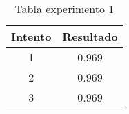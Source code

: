 \begin{table}[!ht]
\begin{center}
\begin{tabular}{|c|c|}\hline
{\bf Intento} & {\bf Resultado}\\ \hline
1 & 0.969\\
2 & 0.969\\
3 & 0.969\\
\hline
\end{tabular}
\end{center}
\caption{Tabla experimento 1}
\label{Mitabla}
\end{table}